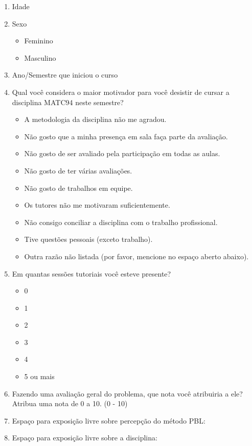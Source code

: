 \acresetall
\label{form-disciplina-desistente}
\begin{enumerate}
\item{Idade}
\item{Sexo}
\begin{itemize}
	\item{Feminino}
	\item{Masculino}
\end{itemize}
\item{Ano/Semestre que iniciou o curso}
\AfirmacaoLikert{\LikertDA{}}
\AfirmacaoLikert{\LikertDB{}}
\AfirmacaoLikert{\LikertDC{}}
\AfirmacaoLikert{\LikertDD{}}
\AfirmacaoLikert{\LikertDE{}}
\AfirmacaoLikert{\LikertDF{}}
\AfirmacaoLikert{\LikertDG{}}
\AfirmacaoLikert{\LikertDGa{}}
\item{Qual você considera o maior motivador para você desistir de
cursar a disciplina MATC94 neste semestre?}
\begin{itemize}
\item{A metodologia da disciplina não me agradou.}
\item{Não gosto que a minha presença em sala faça parte da avaliação.}
\item{Não gosto de ser avaliado pela participação em todas as aulas.}
\item{Não gosto de ter várias avaliações.}
\item{Não gosto de trabalhos em equipe.}
\item{Os tutores não me motivaram suficientemente.}
\item{Não consigo conciliar a disciplina com o trabalho profissional.}
\item{Tive questões pessoais (exceto trabalho).}
\item{Outra razão não listada (por favor, mencione no espaço aberto abaixo).}
\end{itemize}
\AfirmacaoLikert{\LikertDH{}}
\AfirmacaoLikert{\LikertDI{}}
\AfirmacaoLikert{\LikertDJ{}}
\AfirmacaoLikert{\LikertDO{}}
\item{Em quantas sessões tutoriais você esteve presente?}
\begin{itemize}
\item{0}
\item{1}
\item{2}
\item{3}
\item{4}
\item{5 ou mais}
\end{itemize}
\AfirmacaoLikert{\LikertDOa{}}
\item{Fazendo uma avaliação geral do problema, que nota você
atribuiria a ele? Atribua uma nota de 0 a 10. (0 - 10)}
\item{Espaço para exposição livre sobre percepção do método PBL:}
\item{Espaço para exposição livre sobre a disciplina:}
\end{enumerate}
